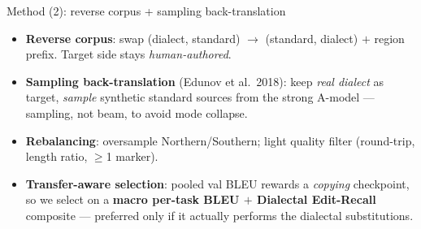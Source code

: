 \documentclass[aspectratio=169,11pt]{beamer}
\newcommand{\hl}[1]{\textcolor{oiblue}{\textbf{#1}}}
\begin{document}
\begin{frame}{Method (2): reverse corpus + sampling back-translation}
  \centering
  \vspace{0.3em}
  \begin{itemize}\small
    \item \hl{Reverse corpus}: swap (dialect, standard) $\rightarrow$ (standard, dialect) $+$ region prefix.
          Target side stays \emph{human-authored}.
    \item \hl{Sampling back-translation} (Edunov et al.\ 2018): keep \emph{real dialect} as target,
          \emph{sample} synthetic standard sources from the strong A-model --- sampling, not beam, to avoid mode collapse.
    \item \hl{Rebalancing}: oversample Northern/Southern; light quality filter (round-trip, length ratio, $\geq$1 marker).
    \item \hl{Transfer-aware selection}: pooled val BLEU rewards a \emph{copying} checkpoint, so we select on a \hl{macro per-task BLEU $+$ Dialectal Edit-Recall} composite --- preferred only if it actually performs the dialectal substitutions.
  \end{itemize}
\end{frame}
\end{document}
